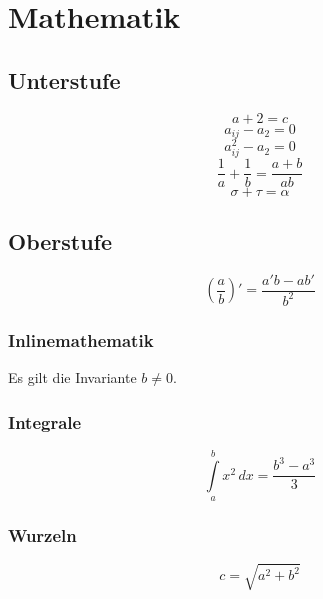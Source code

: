 \section{Mathematik}

\label{sec:mathematik}
 
\subsection{Unterstufe}
\label{sec:unterstufe}

	\begin{equation*} %
  	a + 2 = c
	\end{equation*}
	\begin{equation*}
  	a_{ij} - a_2 = 0
	\end{equation*}
	\begin{equation*}
  	a_{ij}^2 - a_2 = 0
	\end{equation*} 
	\begin{equation*}
  	\frac{1}{a} + \frac{1}{b} = \frac{a+b}{ab}
	\end{equation*}
	\begin{equation*}
  	\sigma + \tau = \alpha
	\end{equation*}

\subsection{Oberstufe} 
\label{sec:oberstufe}
	\begin{equation}
 	 \label{eq:1}
  	\left( \frac{a}{b} \right)' = \frac{a'b-ab'}{b^{2}}
	\end{equation} 

\subsubsection{Inlinemathematik}
Es gilt die Invariante $b \neq 0$.

\subsubsection{Integrale}
\begin{equation}
  \label{eq:2}
  \int\limits_{a}^{b} x^{2} \, dx = \frac{ b^{3} - a^{3} }{3}
\end{equation}

\subsubsection{Wurzeln}
\begin{equation}
  \label{eq:3}
  c = \sqrt{ a^{2} + b^{2} }
\end{equation}